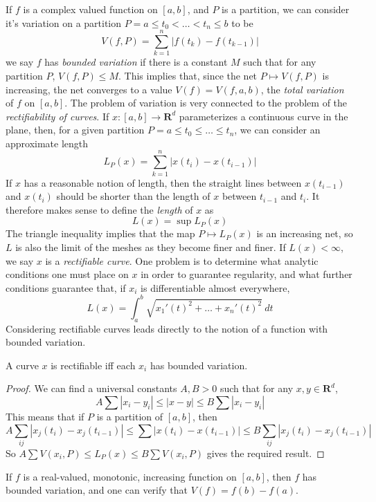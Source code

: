 If $f$ is a complex valued function on $[a,b]$, and $P$ is a partition, we can consider it's variation on a partition $P = a \leq t_0 < \dots < t_n \leq b$ to be
%
\[ V(f,P) = \sum_{k = 1}^n |f(t_k) - f(t_{k-1})| \]
%
we say $f$ has \emph{bounded variation} if there is a constant $M$ such that for any partition $P$, $V(f,P) \leq M$. This implies that, since the net $P \mapsto V(f,P)$ is increasing, the net converges to a value $V(f) = V(f,a,b)$, the \emph{total variation} of $f$ on $[a,b]$. The problem of variation is very connected to the problem of the {\it rectifiability of curves}. If $x: [a,b] \to \mathbf{R}^d$ parameterizes a continuous curve in the plane, then, for a given partition $P = a \leq t_0 \leq \dots \leq t_n$, we can consider an approximate length
%
\[ L_P(x) = \sum_{k = 1}^n |x(t_i) - x(t_{i-1})| \]
%
If $x$ has a reasonable notion of length, then the straight lines between $x(t_{i-1})$ and $x(t_i)$ should be shorter than the length of $x$ between $t_{i-1}$ and $t_i$. It therefore makes sense to define the \emph{length} of $x$ as
%
\[ L(x) = \sup L_P(x) \]
%
The triangle inequality implies that the map $P \mapsto L_P(x)$ is an increasing net, so $L$ is also the limit of the meshes as they become finer and finer. If $L(x) < \infty$, we say $x$ is a \emph{rectifiable curve}. One problem is to determine what analytic conditions one must place on $x$ in order to guarantee regularity, and what further conditions guarantee that, if $x_i$ is differentiable almost everywhere,
%
\[ L(x) = \int_a^b \sqrt{x_1'(t)^2 + \dots + x_n'(t)^2}\ dt \]
%
Considering rectifiable curves leads directly to the notion of a function with bounded variation.

\begin{theorem}
    A curve $x$ is rectifiable iff each $x_i$ has bounded variation.
\end{theorem}
\begin{proof}
    We can find a universal constants $A,B > 0$ such that for any $x,y \in \mathbf{R}^d$,
    \[ A \sum |x_i - y_i| \leq |x-y| \leq B \sum |x_i - y_i| \]
    This means that if $P$ is a partition of $[a,b]$, then
    \[ A \sum_{ij} |x_j(t_i) - x_j(t_{i-1})| \leq \sum |x(t_i) - x(t_{i-1})| \leq B \sum_{ij} |x_j(t_i) - x_j(t_{i-1})| \]
    So $A \sum V(x_i,P) \leq L_P(x) \leq B \sum V(x_i,P)$ gives the required result.
\end{proof}

\begin{example}
    If $f$ is a real-valued, monotonic, increasing function on $[a,b]$, then $f$ has bounded variation, and one can verify that $V(f) = f(b) - f(a)$.
\end{example}

